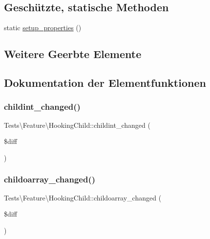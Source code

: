 \subsection*{Geschützte, statische Methoden}
\begin{DoxyCompactItemize}
\item 
static \hyperlink{classTests_1_1Feature_1_1HookingChild_aaab8a5f424d6f87838dd5d82663f0fbc}{setup\+\_\+properties} ()
\end{DoxyCompactItemize}
\subsection*{Weitere Geerbte Elemente}


\subsection{Dokumentation der Elementfunktionen}
\mbox{\label{classTests_1_1Feature_1_1HookingChild_aec22189c85e1742356e0a945559b86ce}} 
\subsubsection{\texorpdfstring{childint\+\_\+changed()}{childint\_changed()}}
{\footnotesize\ttfamily Tests\textbackslash{}\+Feature\textbackslash{}\+Hooking\+Child\+::childint\+\_\+changed (\begin{DoxyParamCaption}\item[{}]{\$diff }\end{DoxyParamCaption})\hspace{0.3cm}{\ttfamily [protected]}}

\mbox{\label{classTests_1_1Feature_1_1HookingChild_ae4cc9a773f6ec10e27a12fc8951470a1}} 
\subsubsection{\texorpdfstring{childoarray\+\_\+changed()}{childoarray\_changed()}}
{\footnotesize\ttfamily Tests\textbackslash{}\+Feature\textbackslash{}\+Hooking\+Child\+::childoarray\+\_\+changed (\begin{DoxyParamCaption}\item[{}]{\$diff }\end{DoxyParamCaption})\hspace{0.3cm}{\ttfamily [protected]}}

